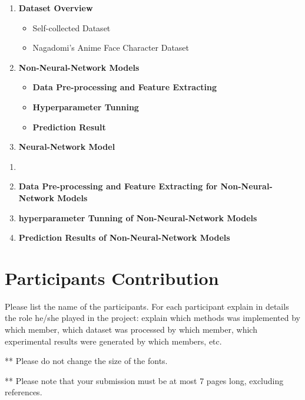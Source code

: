 \documentclass[11.5pt]{article}
\begin{document}
\begin{enumerate}
    \item \textbf{Dataset Overview}
        \begin{itemize}
            \item Self-collected Dataset
            \item Nagadomi’s Anime Face Character Dataset
        \end{itemize}
    \item \textbf{Non-Neural-Network Models}
        \begin{itemize}
            \item \textbf{Data Pre-processing and Feature Extracting}
            \item \textbf{Hyperparameter Tunning}
            \item \textbf{Prediction Result}
        \end{itemize}
    \item \textbf{Neural-Network Model}
        \
\end{enumerate}
\begin{enumerate}
    \item 
    \item \textbf{Data Pre-processing and Feature Extracting for Non-Neural-Network Models}
    \item \textbf{hyperparameter Tunning of Non-Neural-Network Models}
    \item \textbf{Prediction Results of Non-Neural-Network Models}
\end{enumerate}

\section{Participants Contribution}
Please list the name of the participants. For each participant explain in details the role he/she played in the project: explain which methods was implemented by which member, which dataset was processed by which member, which experimental results were generated by which members, etc.

\vspace{10mm}
** Please do not change the size of the fonts.

** Please note that your submission must be at most 7 pages long, excluding references.
\end{document}
